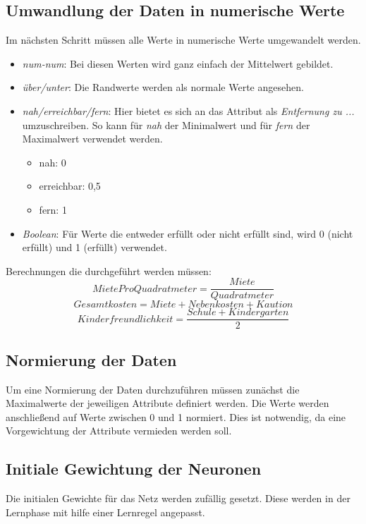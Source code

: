 \subsection{Umwandlung der Daten in numerische Werte}
Im nächsten Schritt müssen alle Werte in numerische Werte umgewandelt werden. 
\begin{itemize}
    \item \textit{num-num}: Bei diesen Werten wird ganz einfach der Mittelwert gebildet. 
    \item \textit{über/unter}: Die Randwerte werden als normale Werte angesehen. 
    \item \textit{nah/erreichbar/fern}: Hier bietet es sich an das Attribut als \textit{Entfernung zu ...} umzuschreiben. 
                So kann für \textit{nah} der Minimalwert und für \textit{fern} der Maximalwert verwendet werden.
    \begin{itemize}
        \item nah: 0
        \item erreichbar: 0,5
        \item fern: 1
    \end{itemize}
    \item \textit{Boolean}: Für Werte die entweder erfüllt oder nicht erfüllt sind, wird 0 (nicht erfüllt) und 1 (erfüllt) verwendet.
\end{itemize}

Berechnungen die durchgeführt werden müssen: 
\begin{equation}
        MieteProQuadratmeter = \frac{Miete}{Quadratmeter}
\end{equation}
\begin{equation}
    Gesamtkosten = Miete + Nebenkosten + Kaution
\end{equation}
\begin{equation}
    Kinderfreundlichkeit = \frac{Schule + Kindergarten}{2}
\end{equation}

\subsection{Normierung der Daten}
Um eine Normierung der Daten durchzuführen müssen zunächst die Maximalwerte der 
jeweiligen Attribute definiert werden. Die Werte werden anschließend auf Werte 
zwischen 0 und 1 normiert. Dies ist notwendig, da eine Vorgewichtung der Attribute
vermieden werden soll.

\subsection{Initiale Gewichtung der Neuronen}
Die initialen Gewichte für das Netz werden zufällig gesetzt. Diese werden in der Lernphase 
mit hilfe einer Lernregel angepasst.

